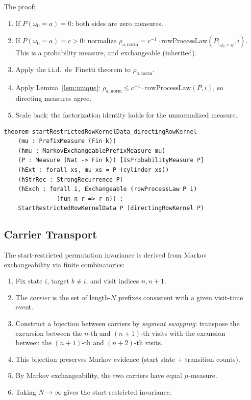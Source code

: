 \documentclass[11pt,a4paper]{article}
\theoremstyle{definition}
\begin{document}
The proof:
\begin{enumerate}
\item If $P(\omega_0 = a) = 0$: both sides are zero measures.
\item If $P(\omega_0 = a) = c > 0$: normalize $\rho_{a,\text{norm}} = c^{-1} \cdot \mathrm{rowProcessLaw}(P|_{\omega_0=a}, i)$.
  This is a probability measure, and exchangeable (inherited).
\item Apply the i.i.d.\ de~Finetti theorem to $\rho_{a,\text{norm}}$.
\item Apply Lemma~\ref{lem:unique}: $\rho_{a,\text{norm}} \leq c^{-1} \cdot \mathrm{rowProcessLaw}(P, i)$,
  so directing measures agree.
\item Scale back: the factorization identity holds for the unnormalized measure.
\end{enumerate}

\begin{lstlisting}
theorem startRestrictedRowKernelData_directingRowKernel
    (mu : PrefixMeasure (Fin k))
    (hmu : MarkovExchangeablePrefixMeasure mu)
    (P : Measure (Nat -> Fin k)) [IsProbabilityMeasure P]
    (hExt : forall xs, mu xs = P (cylinder xs))
    (hStrRec : StrongRecurrence P)
    (hExch : forall i, Exchangeable (rowProcessLaw P i)
               (fun n r => r n)) :
    StartRestrictedRowKernelData P (directingRowKernel P)
\end{lstlisting}

\subsection{Carrier Transport}

The start-restricted permutation invariance is derived from Markov
exchangeability via finite combinatorics:

\begin{enumerate}
\item Fix state $i$, target $b \neq i$, and visit indices $n, n+1$.
\item The \emph{carrier} is the set of length-$N$ prefixes consistent with
  a given visit-time event.
\item Construct a bijection between carriers by \emph{segment swapping}:
  transpose the excursion between the $n$-th and $(n+1)$-th visits with
  the excursion between the $(n+1)$-th and $(n+2)$-th visits.
\item This bijection preserves Markov evidence (start state + transition counts).
\item By Markov exchangeability, the two carriers have equal $\mu$-measure.
\item Taking $N \to \infty$ gives the start-restricted invariance.
\end{enumerate}
\end{document}
